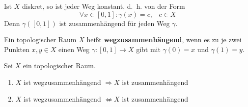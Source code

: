 \begin{beispiel}
    Ist $X$ diskret, so ist jeder Weg konstant, d.~h. von der Form
    \[\forall x \in [0,1]: \gamma(x) = c, \;\;\; c \in X\]
    Denn $\gamma([0,1])$ ist zusammenhängend für jeden Weg $\gamma$.
\end{beispiel}

\begin{definition}
    Ein topologischer Raum $X$ heißt \textbf{wegzusammenhängend},
    wenn es zu je zwei Punkten $x,y \in X$ einen Weg $\gamma:[0,1] \rightarrow X$
    gibt mit $\gamma(0)=x$ und $\gamma(1)=y$.
\end{definition}

\begin{bemerkung}\label{kor:wegzusammehang-impliziert-zusammenhang}
    Sei $X$ ein topologischer Raum.

    \begin{enumerate}[label=(\roman*)]
        \item $X$ ist wegzusammenhängend $\Rightarrow X$ ist zusammenhängend
        \item $X$ ist wegzusammenhängend $\not\Leftarrow X$ ist zusammenhängend
    \end{enumerate}
\end{bemerkung}

